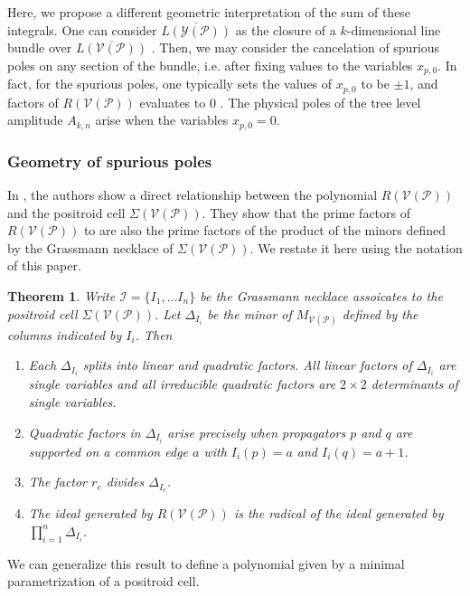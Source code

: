\documentclass[11pt]{article}
\newcommand{\cP}{\mathcal{P}}
\newcommand{\cV}{\mathcal{V}}
\newcommand{\cY}{\mathcal{Y}}
\newcommand{\VP}{\cV(\cP)}
\newcommand{\YP}{\cY(\cP)}
\newcommand{\cI}{\mathcal{I}}
\newtheorem{thm}{Theorem}[section]
\theoremstyle{remark}
\theoremstyle{definition}
\begin{document}
Here, we propose a different geometric interpretation of the sum of
these integrals. One can consider $\overline{L(\YP)}$ as the closure of a $k$-dimensional
  line bundle over $\overline{L(\VP)}$ \cite{non-orientable}. Then, we may consider the
cancelation of spurious poles on any section of the bundle, i.e. after fixing values to the variables $x_{p, 0}$. In fact,
for the spurious poles, one typically sets the values of $x_{p,0}$ to
be $\pm 1$, and factors of $R(\VP)$ evaluates to $0$ \cite{??}. The physical poles of the tree level amplitude $A_{k,n}$ arise when the variables $x_{p, 0} = 0$. 

\subsubsection{Geometry of spurious poles}

In \cite{GWLDCII}, the authors show a direct relationship between the polynomial $R(\VP)$ and the positroid cell $\Sigma(\VP)$. They show that the prime factors of $R(\VP)$ to are also the prime factors of the product of the minors defined by the Grassmann necklace of $\Sigma(\VP)$. We restate it here using the notation of this paper.

\begin{thm} \cite[Proposition 5.3]{GWLDCII} \label{res:prop alg gives rad}
Write $\cI = \{I_1, \ldots I_n\}$ be the Grassmann necklace assoicates to the positroid cell $\Sigma(\VP)$. Let $\Delta_{I_i}$ be the minor of $M_{\VP}$ defined by the columns indicated by $I_i$. Then
  \begin{enumerate}
   \item Each $\Delta_{I_i}$ splits into linear and quadratic factors.  All linear factors of  $\Delta_{I_i}$ are single variables and all irreducible quadratic factors are $2\times 2$ determinants of single variables.
    \item Quadratic factors in $\Delta_{I_i}$ arise precisely when propagators $p$ and $q$ are supported on a common edge $a$ with $I_i(p)=a$ and $I_i(q)=a+1$.
    \item The factor $r_e$ divides $\Delta_{I_e}$.
    \item The ideal generated by $R(\VP)$ is the radical of the ideal generated by $\prod_{i=1}^{n}\Delta_{I_i}$.
  \end{enumerate}
\end{thm}

We can generalize this result to define a polynomial given by a minimal parametrization of a positroid cell. 
\end{document}
